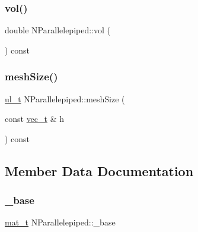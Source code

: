 \mbox{\label{class_n_parallelepiped_a8529874bae044bdee3e0d805dae1887d}} 
\subsubsection{\texorpdfstring{vol()}{vol()}}
{\footnotesize\ttfamily double N\+Parallelepiped\+::vol (\begin{DoxyParamCaption}{ }\end{DoxyParamCaption}) const}

\mbox{\label{class_n_parallelepiped_a99696422faefb6e2f558c794017c95e4}} 
\subsubsection{\texorpdfstring{meshSize()}{meshSize()}}
{\footnotesize\ttfamily \mbox{\hyperlink{group___n_algebra_ga1b140a2034db3f5dfe18a987745df43a}{ul\+\_\+t}} N\+Parallelepiped\+::mesh\+Size (\begin{DoxyParamCaption}\item[{const \mbox{\hyperlink{_n_vector_8h_a0a2cfc67e738a3d73e4f12098c4c07f6}{vec\+\_\+t}} \&}]{h }\end{DoxyParamCaption}) const\hspace{0.3cm}{\ttfamily [protected]}}



\subsection{Member Data Documentation}
\mbox{\label{class_n_parallelepiped_a02542ae7d5e1d052412eb06a292e0e9d}} 
\subsubsection{\texorpdfstring{\_base}{\_base}}
{\footnotesize\ttfamily \mbox{\hyperlink{_n_p_matrix_8h_a44dfb60c1e03b44e98a332fb2ae71947}{mat\+\_\+t}} N\+Parallelepiped\+::\+\_\+base\hspace{0.3cm}{\ttfamily [protected]}}

